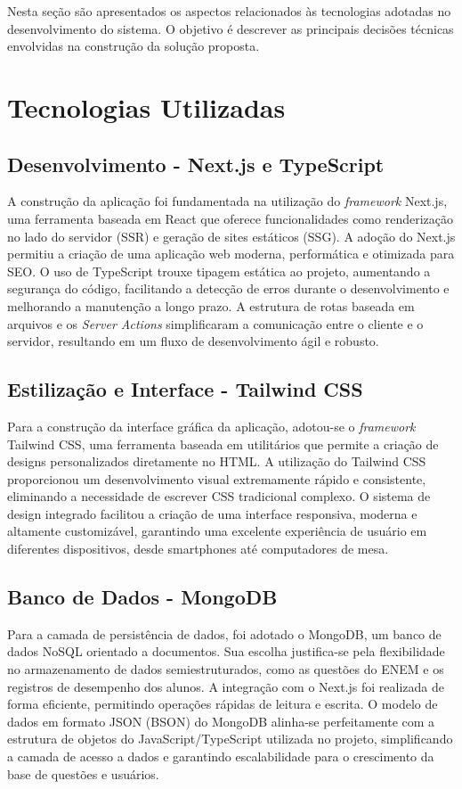 \documentclass[
12pt,
openright,
oneside,
a4paper,
brazil
]{abntex2}
\begin{document}
Nesta seção são apresentados os aspectos relacionados às tecnologias adotadas no desenvolvimento do sistema. O objetivo é descrever as principais decisões técnicas envolvidas na construção da solução proposta.

\section{Tecnologias Utilizadas}
\subsection{Desenvolvimento - Next.js e TypeScript}
A construção da aplicação foi fundamentada na utilização do \textit{framework} Next.js, uma ferramenta baseada em React que oferece funcionalidades como renderização no lado do servidor (SSR) e geração de sites estáticos (SSG). A adoção do Next.js permitiu a criação de uma aplicação web moderna, performática e otimizada para SEO. O uso de TypeScript trouxe tipagem estática ao projeto, aumentando a segurança do código, facilitando a detecção de erros durante o desenvolvimento e melhorando a manutenção a longo prazo. A estrutura de rotas baseada em arquivos e os \textit{Server Actions} simplificaram a comunicação entre o cliente e o servidor, resultando em um fluxo de desenvolvimento ágil e robusto.

\subsection{Estilização e Interface - Tailwind CSS}
Para a construção da interface gráfica da aplicação, adotou-se o \textit{framework} Tailwind CSS, uma ferramenta baseada em utilitários que permite a criação de designs personalizados diretamente no HTML. A utilização do Tailwind CSS proporcionou um desenvolvimento visual extremamente rápido e consistente, eliminando a necessidade de escrever CSS tradicional complexo. O sistema de design integrado facilitou a criação de uma interface responsiva, moderna e altamente customizável, garantindo uma excelente experiência de usuário em diferentes dispositivos, desde smartphones até computadores de mesa.

\subsection{Banco de Dados - MongoDB}
Para a camada de persistência de dados, foi adotado o MongoDB, um banco de dados NoSQL orientado a documentos. Sua escolha justifica-se pela flexibilidade no armazenamento de dados semiestruturados, como as questões do ENEM e os registros de desempenho dos alunos. A integração com o Next.js foi realizada de forma eficiente, permitindo operações rápidas de leitura e escrita. O modelo de dados em formato JSON (BSON) do MongoDB alinha-se perfeitamente com a estrutura de objetos do JavaScript/TypeScript utilizada no projeto, simplificando a camada de acesso a dados e garantindo escalabilidade para o crescimento da base de questões e usuários.
\end{document}
